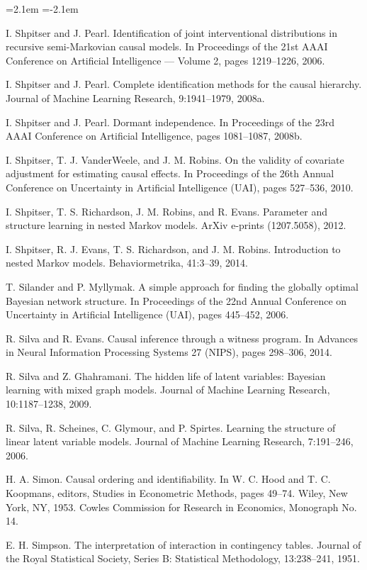 \begin{list}{}{\leftmargin=2.1em
 \itemindent=-2.1em\parsep=0pt\itemsep=3pt}
\item I. Shpitser and J. Pearl. Identification of joint interventional distributions in recursive semi-Markovian causal models. In Proceedings of the 21st AAAI Conference on Artificial Intelligence --- Volume 2, pages 1219--1226, 2006.
\item I. Shpitser and J. Pearl. Complete identification methods for the causal hierarchy. Journal of Machine Learning Research, 9:1941--1979, 2008a.
\item I. Shpitser and J. Pearl. Dormant independence. In Proceedings of the 23rd AAAI Conference on Artificial Intelligence, pages 1081--1087, 2008b.
\item I. Shpitser, T. J. VanderWeele, and J. M. Robins. On the validity of covariate adjustment for estimating causal effects. In Proceedings of the 26th Annual Conference on Uncertainty in Artificial Intelligence (UAI), pages 527--536, 2010.
\item I. Shpitser, T. S. Richardson, J. M. Robins, and R. Evans. Parameter and structure learning in nested Markov models. ArXiv e-prints (1207.5058), 2012.
\item I. Shpitser, R. J. Evans, T. S. Richardson, and J. M. Robins. Introduction to nested Markov models. Behaviormetrika, 41:3--39, 2014.
\item T. Silander and P. Myllymak. A simple approach for finding the globally optimal Bayesian network structure. In Proceedings of the 22nd Annual Conference on Uncertainty in Artificial Intelligence (UAI), pages 445--452, 2006.
\item R. Silva and R. Evans. Causal inference through a witness program. In Advances in Neural Information Processing Systems 27 (NIPS), pages 298--306, 2014.
\item R. Silva and Z. Ghahramani. The hidden life of latent variables: Bayesian learning with mixed graph models. Journal of Machine Learning Research, 10:1187--1238, 2009.
\item R. Silva, R. Scheines, C. Glymour, and P. Spirtes. Learning the structure of linear latent variable models. Journal of Machine Learning Research, 7:191--246, 2006.
\item H. A. Simon. Causal ordering and identifiability. In W. C. Hood and T. C. Koopmans, editors, Studies in Econometric Methods, pages 49--74. Wiley, New York, NY, 1953. Cowles Commission for Research in Economics, Monograph No. 14.
\item E. H. Simpson. The interpretation of interaction in contingency tables. Journal of the Royal Statistical Society, Series B: Statistical Methodology, 13:238--241, 1951.

\end{list}
